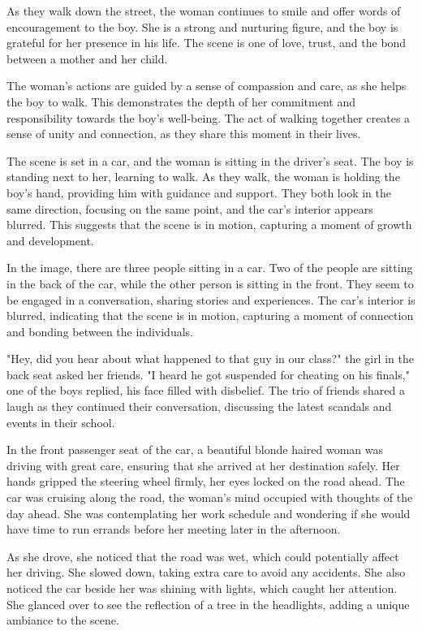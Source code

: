 \documentclass[smalldemyvopaper,11pt,twoside,onecolumn,openright,extrafontsizes]{memoir}
\begin{document}
As they walk down the street, the woman continues to smile and offer words of encouragement to the boy. She is a strong and nurturing figure, and the boy is grateful for her presence in his life. The scene is one of love, trust, and the bond between a mother and her child.\par
The woman's actions are guided by a sense of compassion and care, as she helps the boy to walk. This demonstrates the depth of her commitment and responsibility towards the boy's well-being. The act of walking together creates a sense of unity and connection, as they share this moment in their lives.\par
The scene is set in a car, and the woman is sitting in the driver's seat. The boy is standing next to her, learning to walk. As they walk, the woman is holding the boy's hand, providing him with guidance and support. They both look in the same direction, focusing on the same point, and the car's interior appears blurred. This suggests that the scene is in motion, capturing a moment of growth and development.\par
In the image, there are three people sitting in a car. Two of the people are sitting in the back of the car, while the other person is sitting in the front. They seem to be engaged in a conversation, sharing stories and experiences. The car's interior is blurred, indicating that the scene is in motion, capturing a moment of connection and bonding between the individuals.\par
"Hey, did you hear about what happened to that guy in our class?" the girl in the back seat asked her friends. "I heard he got suspended for cheating on his finals," one of the boys replied, his face filled with disbelief. The trio of friends shared a laugh as they continued their conversation, discussing the latest scandals and events in their school.\par
In the front passenger seat of the car, a beautiful blonde haired woman was driving with great care, ensuring that she arrived at her destination safely. Her hands gripped the steering wheel firmly, her eyes locked on the road ahead. The car was cruising along the road, the woman's mind occupied with thoughts of the day ahead. She was contemplating her work schedule and wondering if she would have time to run errands before her meeting later in the afternoon.\par
As she drove, she noticed that the road was wet, which could potentially affect her driving. She slowed down, taking extra care to avoid any accidents. She also noticed the car beside her was shining with lights, which caught her attention. She glanced over to see the reflection of a tree in the headlights, adding a unique ambiance to the scene.\par
\end{document}
